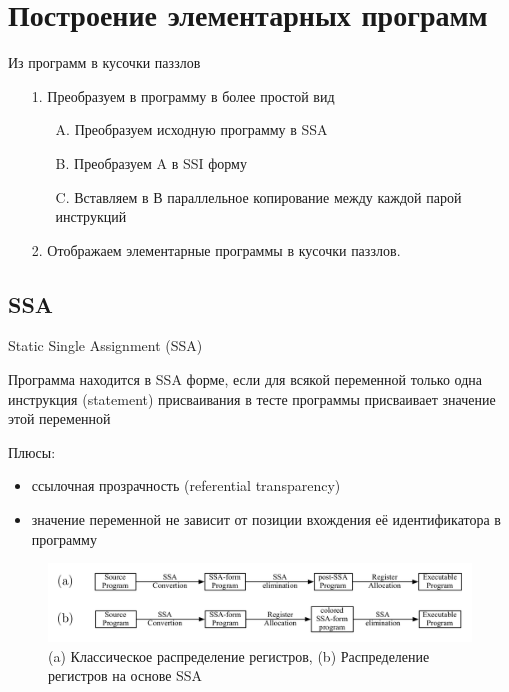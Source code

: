 \documentclass[aspectratio=169
  , xcolor={svgnames}
  , hyperref={ colorlinks,citecolor=DeepPink4
             , linkcolor=DarkRed,urlcolor=DarkBlue}
  , russian
  ]{beamer}
\theoremstyle{exerciseStyle1}
\begin{document}
\section{Построение элементарных программ}

\begin{frame}[fragile]{Из программ в кусочки паззлов}
\begin{enumerate}
\item[1.] Преобразуем в программу в более простой вид
  \begin{enumerate}
  \item[A.] Преобразуем исходную программу в SSA
  \item[B.] Преобразуем A в SSI форму
  \item[C.] Вставляем в В параллельное копирование между каждой парой инструкций
  \end{enumerate}
\item[2.] Отображаем элементарные программы в кусочки паззлов.
\end{enumerate}
\end{frame}

\subsection{SSA}

\begin{frame}[fragile]{Static Single Assignment (SSA)}

\begin{definition}
Программа находится в SSA форме, если для всякой переменной только одна инструкция (statement) присваивания в тесте программы присваивает значение этой переменной
\end{definition}

Плюсы:
\begin{itemize}
\item ссылочная прозрачность (referential transparency)
\item значение переменной не зависит от позиции вхождения её идентификатора в программу
\end{itemize}
\end{frame}


\begin{frame}[fragile]{}
\begin{figure}
\includegraphics[width=1.0\linewidth]{figures/ssa-compilation-scheme}
\caption{(a) Классическое распределение регистров, (b) Распределение регистров на основе SSA}
\label{fig:ssa-compilation-scheme}
\end{figure}
\end{frame}
\end{document}
